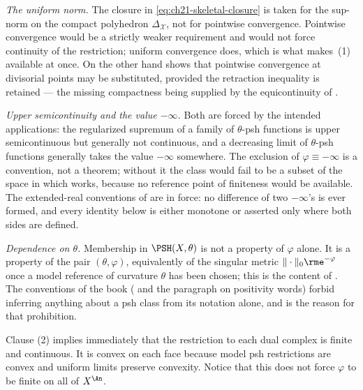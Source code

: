 \emph{The uniform norm.}  The closure in
\eqref{eq:ch21-skeletal-closure} is taken for the sup-norm on the compact
polyhedron \(\Delta_{\mathcal X}\), not for pointwise convergence.  Pointwise
convergence would be a strictly weaker requirement and would not force
continuity of the restriction; uniform convergence does, which is what makes
\,(1) available at once.  On the
other hand  shows that pointwise convergence at
divisorial points may be substituted, provided the retraction inequality is
retained --- the missing compactness being supplied by the equicontinuity of
.

\emph{Upper semicontinuity and the value \(-\infty\).}  Both are forced by
the intended applications: the regularized supremum of a family of
\(\theta\)-psh functions is upper semicontinuous but generally not
continuous, and a decreasing limit of \(\theta\)-psh functions generally
takes the value \(-\infty\) somewhere.  The exclusion of
\(\varphi\equiv-\infty\) is a convention, not a theorem; without it the
class would fail to be a subset of the space in which
 works, because no reference point of finiteness would
be available.  The extended-real conventions of
 are in force: no difference of two
\(-\infty\)'s is ever formed, and every identity below is either
monotone or asserted only where both sides are defined.

\emph{Dependence on \(\theta\).}  Membership in \(\PSH(X,\theta)\) is not a
property of \(\varphi\) alone.  It is a property of the pair
\((\theta,\varphi)\), equivalently of the singular metric
\(\|\cdot\|_0\rme^{-\varphi}\) once a model reference of curvature
\(\theta\) has been chosen; this is the content of
.  The conventions of the book
( and the paragraph on positivity words)
forbid inferring anything about a psh class from its notation alone, and
 is the reason for that prohibition.

Clause (2) implies immediately that the restriction to each dual complex is
finite and continuous.  It is convex on each face because model psh
restrictions are convex and uniform limits preserve convexity.  Notice that
this does not force \(\varphi\) to be finite on all of \(X^{\An}\).

